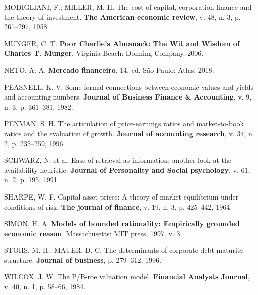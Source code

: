 \documentclass[grad,numbers]{coppe}
\newenvironment{cslreferences}%
  {}%
  {\par}
\begin{document}
\begin{cslreferences}
  \leavevmode\hypertarget{ref-modigliani1958}{}%
  MODIGLIANI, F.; MILLER, M. H. The cost of capital, corporation finance and the theory of investment. \textbf{The American economic review}, v. 48, n. 3, p. 261--297, 1958.

  \leavevmode\hypertarget{ref-munger2006}{}%
  MUNGER, C. T. \textbf{Poor Charlie's Almanack: The Wit and Wisdom of Charles T. Munger}. Virginia Beach: Donning Company, 2006.

  \leavevmode\hypertarget{ref-assafneto2018}{}%
  NETO, A. A. \textbf{Mercado financeiro}. 14. ed. São Paulo: Atlas, 2018.

  \leavevmode\hypertarget{ref-peasnell1982}{}%
  PEASNELL, K. V. Some formal connections between economic values and yields and accounting numbers. \textbf{Journal of Business Finance \& Accounting}, v. 9, n. 3, p. 361--381, 1982.

  \leavevmode\hypertarget{ref-penman1996}{}%
  PENMAN, S. H. The articulation of price-earnings ratios and market-to-book ratios and the evaluation of growth. \textbf{Journal of accounting research}, v. 34, n. 2, p. 235--259, 1996.

  \leavevmode\hypertarget{ref-schwarz1991}{}%
  SCHWARZ, N. et al. Ease of retrieval as information: another look at the availability heuristic. \textbf{Journal of Personality and Social psychology}, v. 61, n. 2, p. 195, 1991.

  \leavevmode\hypertarget{ref-sharpe1964}{}%
  SHARPE, W. F. Capital asset prices: A theory of market equilibrium under conditions of risk. \textbf{The journal of finance}, v. 19, n. 3, p. 425--442, 1964.

  \leavevmode\hypertarget{ref-simon1997}{}%
  SIMON, H. A. \textbf{Models of bounded rationality: Empirically grounded economic reason}. Massachusetts: MIT press, 1997. v. 3

  \leavevmode\hypertarget{ref-stohs1996}{}%
  STOHS, M. H.; MAUER, D. C. The determinants of corporate debt maturity structure. \textbf{Journal of business}, p. 279--312, 1996.

  \leavevmode\hypertarget{ref-wilcox1984}{}%
  WILCOX, J. W. The P/B-roe valuation model. \textbf{Financial Analysts Journal}, v. 40, n. 1, p. 58--66, 1984.
  \end{cslreferences}
  \backmatter
  
  

\end{document}
